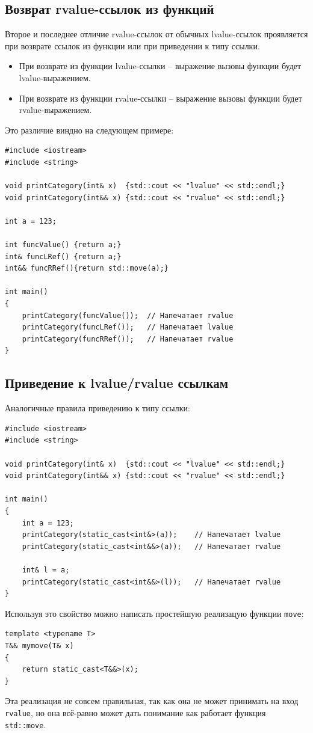 \documentclass{article}
\begin{document}
\newpage
\subsection*{Возврат rvalue-ссылок из функций}
Второе и последнее отличие rvalue-ссылок от обычных lvalue-ссылок проявляется при возврате ссылок из функции или при приведении к типу ссылки.
\begin{itemize}
\item При возврате из функции lvalue-ссылки -- выражение вызовы функции будет lvalue-выражением.
\item При возврате из функции rvalue-ссылки -- выражение вызовы функции будет rvalue-выражением.
\end{itemize}
Это различие виндно на следующем примере:
\begin{lstlisting}
#include <iostream>
#include <string>

void printCategory(int& x)  {std::cout << "lvalue" << std::endl;}
void printCategory(int&& x) {std::cout << "rvalue" << std::endl;}

int a = 123;

int funcValue() {return a;}
int& funcLRef() {return a;}
int&& funcRRef(){return std::move(a);}

int main() 
{
    printCategory(funcValue());  // Напечатает rvalue
    printCategory(funcLRef());   // Напечатает lvalue
    printCategory(funcRRef());   // Напечатает rvalue
}
\end{lstlisting}

\subsection*{Приведение к lvalue/rvalue ссылкам}
Аналогичные правила приведению к типу ссылки:
\begin{lstlisting}
#include <iostream>
#include <string>

void printCategory(int& x)  {std::cout << "lvalue" << std::endl;}
void printCategory(int&& x) {std::cout << "rvalue" << std::endl;}

int main() 
{
    int a = 123;
    printCategory(static_cast<int&>(a));    // Напечатает lvalue
    printCategory(static_cast<int&&>(a));   // Напечатает rvalue
    
    int& l = a;
    printCategory(static_cast<int&&>(l));   // Напечатает rvalue
}
\end{lstlisting}
Используя это свойство можно написать простейшую реализацую функции \texttt{move}:
\begin{lstlisting}
template <typename T>
T&& mymove(T& x)
{
    return static_cast<T&&>(x);
}
\end{lstlisting}
Эта реализация не совсем правильная, так как она не может принимать на вход \texttt{rvalue}, но она всё-равно может дать понимание как работает функция \texttt{std::move}.
\end{document}
